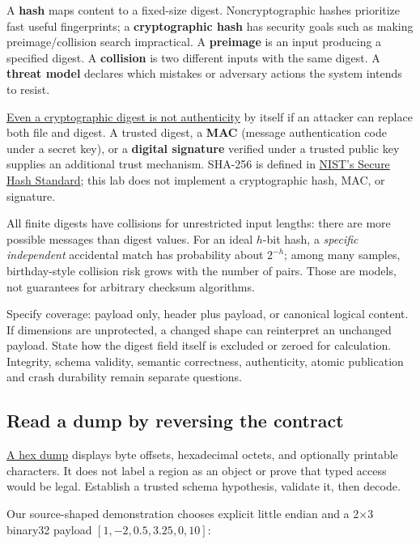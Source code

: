 A \textbf{hash} maps content to a fixed-size digest. Noncryptographic hashes prioritize fast useful fingerprints; a \textbf{cryptographic hash} has security goals such as making preimage/collision search impractical. A \textbf{preimage} is an input producing a specified digest. A \textbf{collision} is two different inputs with the same digest. A \textbf{threat model} declares which mistakes or adversary actions the system intends to resist.

\hyperref[appendix-cbe594d1ab0a]{Even a cryptographic digest is not authenticity} by itself if an attacker can replace both file and digest. A trusted digest, a \textbf{MAC} (message authentication code under a secret key), or a \textbf{digital signature} verified under a trusted public key supplies an additional trust mechanism. SHA-256 is defined in \href{https://csrc.nist.gov/pubs/fips/180-4/upd1/final}{NIST's Secure Hash Standard}; this lab does not implement a cryptographic hash, MAC, or signature.

All finite digests have collisions for unrestricted input lengths: there are more possible messages than digest values. For an ideal \(h\)-bit hash, a \emph{specific independent} accidental match has probability about \(2^{-h}\); among many samples, birthday-style collision risk grows with the number of pairs. Those are models, not guarantees for arbitrary checksum algorithms.

Specify coverage: payload only, header plus payload, or canonical logical content. If dimensions are unprotected, a changed shape can reinterpret an unchanged payload. State how the digest field itself is excluded or zeroed for calculation. Integrity, schema validity, semantic correctness, authenticity, atomic publication and crash durability remain separate questions.

\subsection{Read a dump by reversing the contract}\label{05-engine-i-ch002-read-a-dump-by-reversing-the-contract}

\hyperref[appendix-230b59c0676b]{A hex dump} displays byte offsets, hexadecimal octets, and optionally printable characters. It does not label a region as an object or prove that typed access would be legal. Establish a trusted schema hypothesis, validate it, then decode.

Our source-shaped demonstration chooses explicit little endian and a 2×3 binary32 payload \([1,-2,0.5,3.25,0,10]\):

